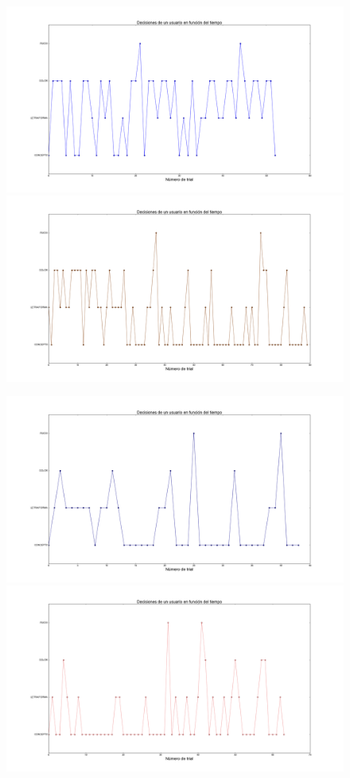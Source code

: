 \documentclass{beamer}
\begin{document}
\begin{frame}
\begin{figure}[h]
 \centering
  \begin{minipage}[c]{1\textwidth}
	\includegraphics[scale=0.11]{user3.png}
	\includegraphics[scale=0.11]{user13.png}
  \end{minipage}
  \begin{minipage}[c]{1\textwidth}
	\includegraphics[scale=0.11]{user8.png}
	\includegraphics[scale=0.11]{user11.png}

\end{minipage}
\end{figure}
\end{frame}
\end{document}
